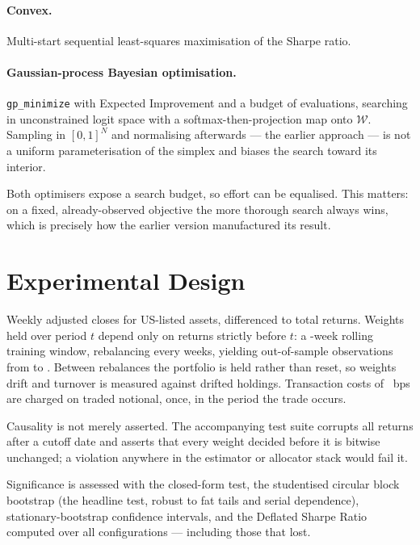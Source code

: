 \documentclass[a4paper,12pt]{article}
\begin{document}
\paragraph{Convex.} Multi-start sequential least-squares maximisation of the
Sharpe ratio.

\paragraph{Gaussian-process Bayesian optimisation.} \texttt{gp\_minimize} with
Expected Improvement and a budget of \gpBudget{} evaluations, searching in
unconstrained logit space with a softmax-then-projection map onto $\mathcal{W}$.
Sampling in $[0,1]^N$ and normalising afterwards --- the earlier approach --- is
not a uniform parameterisation of the simplex and biases the search toward its
interior.

Both optimisers expose a search budget, so effort can be equalised. This matters:
on a fixed, already-observed objective the more thorough search always wins, which
is precisely how the earlier version manufactured its result.

\section{Experimental Design}
Weekly adjusted closes for \nAssets{} US-listed assets, differenced to total
returns. Weights held over period $t$ depend only on returns strictly before $t$:
a \trainWindow{}-week rolling training window, rebalancing every
\rebalanceEvery{} weeks, yielding \oosPeriods{} out-of-sample observations from
\oosStart{} to \oosEnd{}. Between rebalances the portfolio is held rather than
reset, so weights drift and turnover is measured against drifted holdings.
Transaction costs of \costBps{}~bps are charged on traded notional, once, in the
period the trade occurs.

Causality is not merely asserted. The accompanying test suite corrupts all returns
after a cutoff date and asserts that every weight decided before it is bitwise
unchanged; a violation anywhere in the estimator or allocator stack would fail it.

Significance is assessed with the \citet{memmel2003} closed-form test, the
\citet{ledoit2008} studentised circular block bootstrap (the headline test, robust
to fat tails and serial dependence), \citet{politis1994} stationary-bootstrap
confidence intervals, and the \citet{bailey2014} Deflated Sharpe Ratio computed
over all \nTrials{} configurations --- including those that lost.
\end{document}
